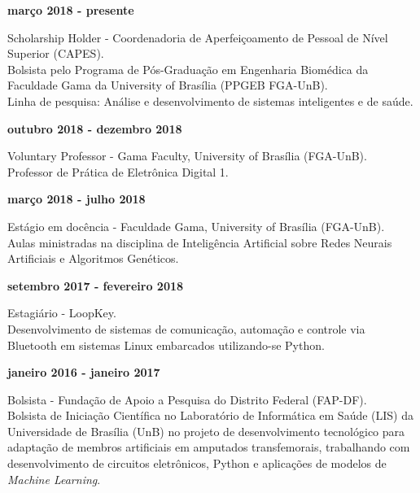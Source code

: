 \documentclass[11pt]{article}
\begin{document}
\textbf{março 2018 - presente}
\begin{addmargin}{0.5cm}
Scholarship Holder - Coordenadoria de Aperfeiçoamento de Pessoal de Nível Superior (CAPES). \\
Bolsista pelo Programa de Pós-Graduação em Engenharia Biomédica
da Faculdade Gama da University of Brasília (PPGEB FGA-UnB).\\
Linha de pesquisa: Análise e desenvolvimento de sistemas inteligentes e de saúde.\\
\end{addmargin}

\textbf{outubro 2018 - dezembro 2018}
\begin{addmargin}{0.5cm}
Voluntary Professor -  Gama Faculty, University of Brasília (FGA-UnB).\\
Professor de Prática de Eletrônica Digital 1. \\
\end{addmargin}

\textbf{março 2018 - julho 2018}
\begin{addmargin}{0.5cm}
Estágio em docência - Faculdade Gama, University of Brasília (FGA-UnB).\\
Aulas ministradas na disciplina de Inteligência Artificial sobre Redes 
Neurais Artificiais e Algoritmos Genéticos. \\
\end{addmargin}

\textbf{setembro 2017 - fevereiro 2018}
\begin{addmargin}{0.5cm}
Estagiário - LoopKey.\\
Desenvolvimento de sistemas de comunicação, automação e controle via Bluetooth
em sistemas Linux  embarcados utilizando-se Python. \\
\end{addmargin}

\newpage

\textbf{janeiro 2016 - janeiro 2017}
\begin{addmargin}{0.5cm}
Bolsista - Fundação de Apoio a Pesquisa do Distrito Federal (FAP-DF).\\
Bolsista de Iniciação Científica no Laboratório de Informática em Saúde (LIS)  da Universidade de
Brasília (UnB) no projeto
de desenvolvimento tecnológico para adaptação de membros artificiais em amputados transfemorais,
trabalhando com desenvolvimento de circuitos eletrônicos, Python e aplicações de modelos de 
\textit{Machine Learning}.\\

\end{addmargin}
\end{document}

